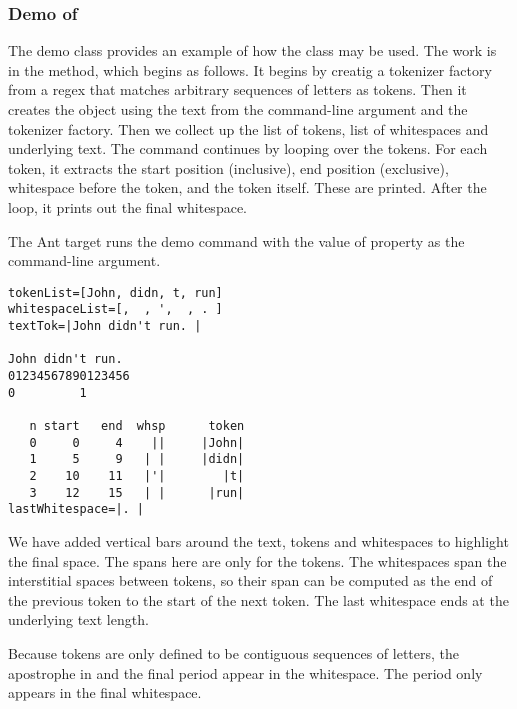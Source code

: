 \subsubsection{Demo of }

The demo class  provides an example of how
the  class may be used.  The work is in the
 method, which begins as follows.
%
%
It begins by creatig a tokenizer factory from a regex that matches
arbitrary sequences of letters as tokens.  Then it creates the
 object using the text from the command-line
argument and the tokenizer factory.  Then we collect up the
list of tokens, list of whitespaces and underlying text.
%
The command continues by looping over the tokens.
%
%
For each token, it extracts the start position (inclusive), end
position (exclusive), whitespace before the token, and the token
itself.  These are printed.  After the loop, it prints out
the final whitespace.
%

The Ant target  runs the demo command with
the value of property  as the command-line argument.
%
\begin{verbatim}
tokenList=[John, didn, t, run]
whitespaceList=[,  , ',  , . ]
textTok=|John didn't run. |

John didn't run.
01234567890123456
0         1

   n start   end  whsp      token
   0     0     4    ||     |John|
   1     5     9   | |     |didn|
   2    10    11   |'|        |t|
   3    12    15   | |      |run|
lastWhitespace=|. |
\end{verbatim}
%
We have added vertical bars around the text, tokens and whitespaces to
highlight the final space.  The spans here are only for the tokens.
The whitespaces span the interstitial spaces between tokens, so their
span can be computed as the end of the previous token to the start of
the next token.  The last whitespace ends at the underlying text length.

Because tokens are only defined to be contiguous sequences of letters,
the apostrophe in  and the final period appear
in the whitespace.  The period only appears in the final whitespace.








